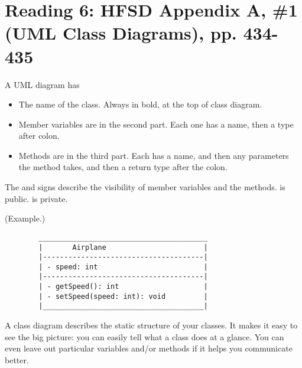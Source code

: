 \documentclass[letterpaper]{article}
\begin{document}
\section{Reading 6: HFSD Appendix A, \#1 (UML Class Diagrams), pp. 434-435}
A UML diagram has 
\begin{itemize}
    \item The name of the class. Always in bold, at the top of class diagram. 
    \item Member variables are in the second part. Each one has a name, then a type after colon. 
    \item Methods are in the third part. Each has a name, and then any parameters the method takes, and then a return type after the colon. 
\end{itemize}
The \code{+} and \code{-} signs describe the visibility of member variables and the methods. \code{+} is public. \code{-} is private.

\begin{mdframed}
    (Example.)
    \begin{verbatim}
        ________________________________________
        |       Airplane                       |
        |--------------------------------------|
        | - speed: int                         |
        |--------------------------------------|
        | - getSpeed(): int                    |
        | - setSpeed(speed: int): void         |
        |______________________________________|\end{verbatim}
\end{mdframed}
A class diagram describes the static structure of your classes. It makes it easy to see the big picture: you can easily tell what a class does at a glance. You can even leave out particular variables and/or methods if it helps you communicate better.
\end{document}
